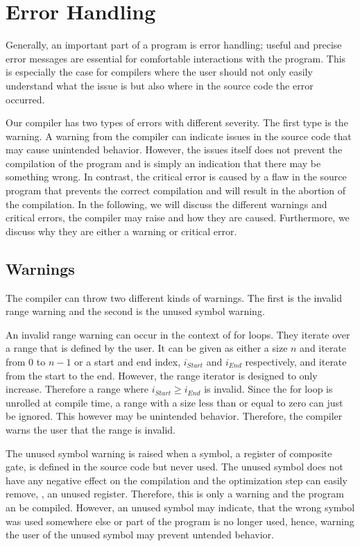 \section{Error Handling}
Generally, an important part of a program is error handling; useful and precise error messages are essential for comfortable interactions with the program. This is especially the case for compilers where the user should not only easily understand what the issue is but also where in the source code the error occurred.  

Our compiler has two types of errors with different severity. The first type is the warning. A warning from the compiler can indicate issues in the source code that may cause unintended behavior. However, the issues itself does not prevent the compilation of the program and is simply an indication that there may be something wrong. In contrast, the critical error is caused by a flaw in the source program that prevents the correct compilation and will result in the abortion of the compilation. In the following, we will discuss the different warnings and critical errors, the compiler may raise and how they are caused. Furthermore, we discuss why they are either a warning or critical error. 

\subsection{Warnings}
The compiler can throw two different kinds of warnings. The first is the invalid range warning and the second is the unused symbol warning.

An invalid range warning can occur in the context of for loops. They iterate over a range that is defined by the user. It can be given as either a size $n$ and iterate from $0$ to $n-1$ or a start and end index, $i_{Start}$ and $i_{End}$ respectively, and iterate from the start to the end. However, the range iterator is designed to only increase. Therefore a range where $i_{Start} \geq i_{End}$ is invalid. Since the for loop is unrolled at compile time, a range with a size less than or equal to zero can just be ignored. This however may be unintended behavior. Therefore, the compiler warns the user that the range is invalid.

The unused symbol warning is raised when a symbol, \eg a register of composite gate, is defined in the source code but never used. The unused symbol does not have any negative effect on the compilation and the optimization step can easily remove, \eg, an unused register. Therefore, this is only a warning and the program an be compiled. However, an unused symbol may indicate, that the wrong symbol was used somewhere else or part of the program is no longer used, hence, warning the user of the unused symbol may prevent untended behavior.

